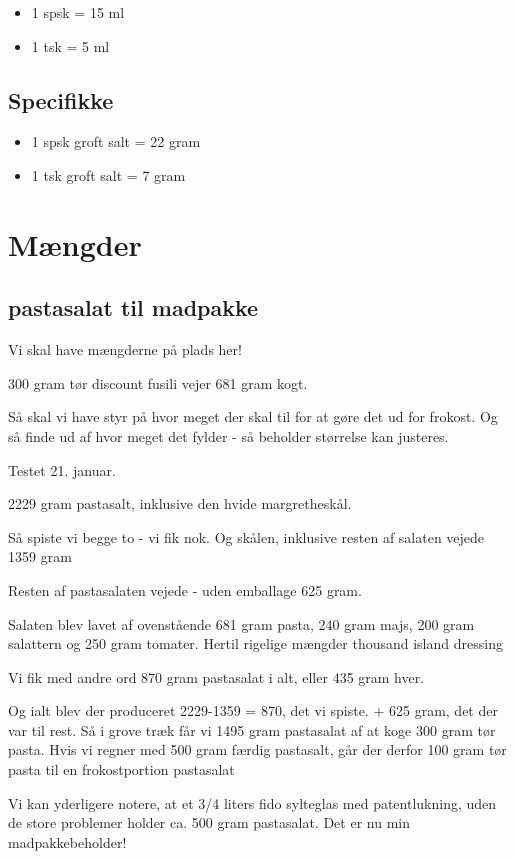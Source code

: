 \documentclass[
]{book}
\providecommand{\tightlist}{%
  \setlength{\itemsep}{0pt}\setlength{\parskip}{0pt}}
\begin{document}
\begin{itemize}
\tightlist
\item
  1 spsk = 15 ml
\item
  1 tsk = 5 ml
\end{itemize}

\subsection{Specifikke}\label{specifikke}

\begin{itemize}
\tightlist
\item
  1 spsk groft salt = 22 gram
\item
  1 tsk groft salt = 7 gram
\end{itemize}

\section{Mængder}\label{muxe6ngder}

\subsection{pastasalat til madpakke}\label{pastasalat-til-madpakke}

Vi skal have mængderne på plads her!

300 gram tør discount fusili vejer
681 gram kogt.

Så skal vi have styr på hvor meget der skal til for at gøre det ud for frokost. Og så
finde ud af hvor meget det fylder - så beholder størrelse kan justeres.

Testet 21. januar.

2229 gram pastasalt, inklusive den hvide margretheskål.

Så spiste vi begge to - vi fik nok. Og skålen, inklusive
resten af salaten vejede 1359 gram

Resten af pastasalaten vejede - uden emballage 625 gram.

Salaten blev lavet af ovenstående 681 gram pasta, 240 gram
majs, 200 gram salattern og 250 gram tomater. Hertil rigelige
mængder thousand island dressing

Vi fik med andre ord 870 gram pastasalat i alt, eller 435 gram hver.

Og ialt blev der produceret
2229-1359 = 870, det vi spiste.
+ 625 gram, det der var til rest.
Så i grove træk får vi 1495 gram pastasalat af at koge 300 gram
tør pasta. Hvis vi regner med 500 gram færdig pastasalt,
går der derfor 100 gram tør pasta til en frokostportion pastasalat

Vi kan yderligere notere, at et 3/4 liters fido sylteglas med
patentlukning, uden de store problemer holder ca. 500 gram
pastasalat. Det er nu min madpakkebeholder!
\end{document}
